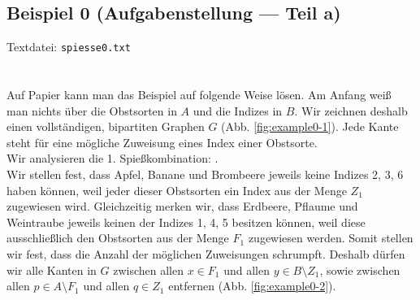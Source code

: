 \subsection{Beispiel 0 (Aufgabenstellung --- Teil a)}\label{example:0}
Textdatei: \texttt{spiesse0.txt}\\
\noindent
{}\\

\noindent
{}\\

Auf Papier kann man das Beispiel auf folgende Weise lösen.
Am Anfang weiß man nichts über die Obstsorten in $A$ und die Indizes in $B$.
Wir zeichnen deshalb einen vollständigen, bipartiten Graphen $G$ (Abb. \ref{fig:example0-1}).
Jede Kante steht für eine mögliche Zuweisung eines Index einer Obstsorte.\\

Wir analysieren die 1. Spießkombination:
.\\
Wir stellen fest, dass Apfel, Banane und Brombeere jeweils keine Indizes 2, 3, 6 haben können,
weil jeder dieser Obstsorten ein Index aus der Menge $Z_1$ zugewiesen wird.
Gleichzeitig merken wir, dass Erdbeere, Pflaume und Weintraube jeweils keinen der Indizes
1, 4, 5 besitzen können, weil diese ausschließlich den Obstsorten aus der Menge $F_1$ zugewiesen werden.
Somit stellen wir fest, dass die Anzahl der möglichen Zuweisungen schrumpft.
Deshalb dürfen wir alle Kanten in $G$ zwischen allen $x \in F_1$ und allen $y \in B \setminus Z_1$,
sowie zwischen allen $p \in A \setminus F_1$ und allen $q \in Z_1$ entfernen (Abb. \ref{fig:example0-2}).\\

